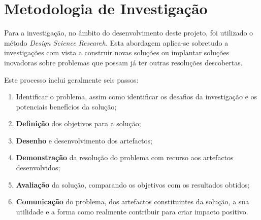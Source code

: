 \section{Metodologia de Investigação}
Para a investigação, no âmbito do desenvolvimento deste projeto, foi utilizado o método \emph{Design Science Research}. Esta abordagem aplica-se sobretudo a investigações com vista a construir novas soluções ou implantar soluções inovadoras sobre problemas que possam já ter outras resoluções descobertas\cite{design_science_research}.

Este processo inclui geralmente seis passos\cite{design_science_research}:
\begin{enumerate}
    \item Identificar o problema, assim como identificar os desafios da investigação e os potenciais benefícios da solução;
    \item \textbf{Definição} dos objetivos para a solução;
    \item \textbf{Desenho} e desenvolvimento dos artefactos;
    \item \textbf{Demonstração} da resolução do problema com recurso aos artefactos desenvolvidos;
    \item \textbf{Avaliação} da solução, comparando os objetivos com os resultados obtidos;
    \item \textbf{Comunicação} do problema, dos artefactos constituintes da solução, a sua utilidade e a forma como realmente contribuir para criar impacto positivo.
\end{enumerate}

